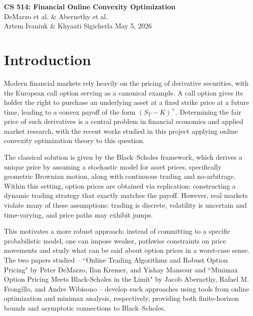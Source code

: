 \documentclass[12pt]{article}
\begin{document}

\noindent
{\large \textbf{CS 514: Financial Online Convexity Optimization}}\\
{\small DeMarzo et al. \& Abernethy et al.}\\
{\normalsize Artem Ivaniuk \& Khyaati Sigicherla \hfill May 5, 2026}
\vspace{1em}

\section*{Introduction}

Modern financial markets rely heavily on the pricing of derivative securities, with the European call option serving as a canonical example. A call option gives its holder the right to purchase an underlying asset at a fixed strike price at a future time, leading to a convex payoff of the form $(S_T - K)^+$. Determining the fair price of such derivatives is a central problem in financial economics and applied market research, with the recent works studied in this project applying online convexity optimization theory to this question.

The classical solution is given by the Black–Scholes framework, which derives a unique price by assuming a stochastic model for asset prices, specifically geometric Brownian motion, along with continuous trading and no-arbitrage. Within this setting, option prices are obtained via replication: constructing a dynamic trading strategy that exactly matches the payoff. However, real markets violate many of these assumptions: trading is discrete, volatility is uncertain and time-varying, and price paths may exhibit jumps.

This motivates a more robust approach: instead of committing to a specific probabilistic model, one can impose weaker, pathwise constraints on price movements and study what can be said about option prices in a worst-case sense. The two papers studied -- ``Online Trading Algorithms and Robust Option Pricing" by Peter DeMarzo, Ilan Kremer, and Yishay Mansour \cite{demarzo2006online} and ``Minimax Option Pricing Meets Black-Scholes in the Limit" by Jacob Abernethy, Rafael M. Frongillo, and Andre Wibisono \cite{abernethy2012minimax} -- develop such approaches using tools from online optimization and minimax analysis, respectively, providing both finite-horizon bounds and asymptotic connections to Black–Scholes.
\end{document}
